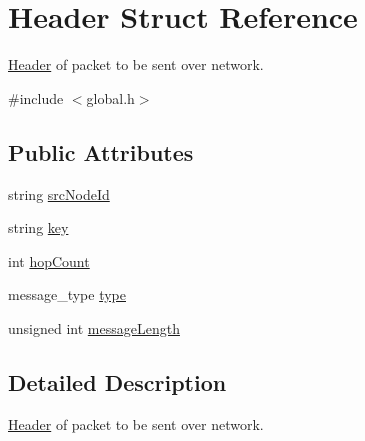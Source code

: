 \hypertarget{structHeader}{\section{Header Struct Reference}
\label{structHeader}
}


\hyperlink{structHeader}{Header} of packet to be sent over network.  




{\ttfamily \#include $<$global.\-h$>$}

\subsection*{Public Attributes}
\begin{DoxyCompactItemize}
\item 
string \hyperlink{structHeader_a679d7b3c49799d034546e100c4e13f01}{src\-Node\-Id}
\item 
string \hyperlink{structHeader_ad001106fe7ad847b04142073cae7e949}{key}
\item 
int \hyperlink{structHeader_ace726663a32d9fecdcdd75b5e3694fd0}{hop\-Count}
\item 
message\-\_\-type \hyperlink{structHeader_ac65c132da14fd2ac678c55db412ce559}{type}
\item 
unsigned int \hyperlink{structHeader_ac869adfa2b931401d8161bd6dd3b2877}{message\-Length}
\end{DoxyCompactItemize}


\subsection{Detailed Description}
\hyperlink{structHeader}{Header} of packet to be sent over network. 


